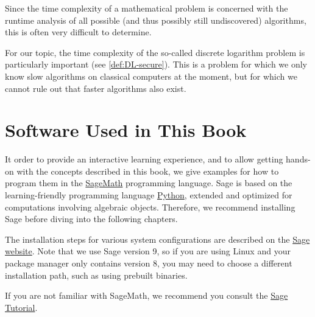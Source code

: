 Since the time complexity of a mathematical problem is concerned with the runtime analysis of all possible (and thus possibly still undiscovered) algorithms, this is often very difficult to determine.

For our topic, the time complexity of the so-called discrete logarithm problem  is particularly important (see \secname{} \ref{def:DL-secure}). This is a problem for which we only know slow algorithms on classical computers at the moment, but for which we cannot rule out that faster algorithms also exist.
 

\section{Software Used in This Book}
\label{sagemath_setup}
It order to provide an interactive learning experience, and to allow getting hands-on with the concepts described in this book, we give examples for how to program them in the \href{https://www.sagemath.org/}{SageMath} programming language. Sage is based on the learning-friendly programming language \href{https://www.python.org/}{Python},  extended and optimized for computations involving algebraic objects. Therefore, we recommend installing Sage before diving into the following chapters.

The installation steps for various system configurations are described on the \href{https://doc.sagemath.org/html/en/installation/index.html}{Sage website}. Note that we use Sage version 9, so if you are using Linux and your package manager only contains version 8, you may need to choose a different installation path, such as using prebuilt binaries.

If you are not familiar with SageMath, we recommend you consult the \href{https://doc.sagemath.org/html/en/tutorial/index.html}{Sage Tutorial}.




